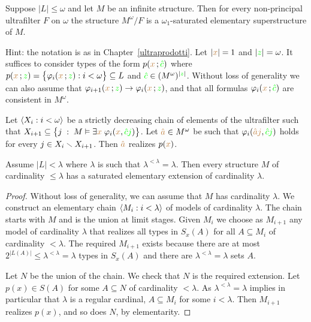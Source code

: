 \documentclass[creche.tex]{subfiles}
\begin{document}
\begin{exercise}
Suppose $|L|\le\omega$ and let $M$ be an infinite structure. Then for every non-principal ultrafilter $F$ on $\omega$ the structure $M^\omega/F$ is a $\omega_1$-saturated elementary superstructure of $M$.

Hint: the notation is as in Chapter~\ref{ultraprodotti}. Let $|{\color{brown} x}|=1$ and 
$|{\color{green} z}|=\omega$. It suffices to consider types of the form $p({\color{brown} x}\,;{\color{green}\hat c})$ where $p({\color{brown} x}\,;{\color{green} z})=\big\{\varphi_i({\color{brown} x}\,;{\color{green} z}):i<\omega\big\}\subseteq L$ and ${\color{green}\hat c}\in(M^\omega)^{|{\color{green} z}|}$. Without loss of generality we can also assume that $\varphi_{i+1}({\color{brown} x}\,;{\color{green} z})\rightarrow\varphi_i({\color{brown} x}\,;{\color{green} z})$, and that all formulas $\varphi_i({\color{brown} x}\,;{\color{green}\hat c})$ are consistent in $M^\omega$. 

Let $\langle X_i:i<\omega\rangle$ be a strictly decreasing chain of elements of the ultrafilter such that  $X_{i+1}\subseteq\big\{j\;:\;M\vDash\exists{\color{brown}x}\;\varphi_i({\color{brown} x},{\color{green}\hat cj})\big\}$. Let ${\color{brown}\hat a}\in M^\omega$ be such that  $\varphi_i({\color{brown}\hat aj},{\color{green}\hat cj})$ holds for every $j\in X_i\smallsetminus X_{i+1}$. Then ${\color{brown}\hat a}$ realizes $p({\color{brown} x})$.\QED
\end{exercise}


\begin{theorem}\label{thm_esistenza_staturo_card_inacc}
Assume $|L|<\lambda$ where $\lambda$ is such that $\lambda^{<\lambda}=\lambda$. Then every structure $M$ of cardinality $\le\lambda$ has a saturated elementary extension of cardinality $\lambda$.
\end{theorem}

\begin{proof}
Without loss of generality, we can assume that $M$ has cardinality $\lambda$. We construct an elementary chain $\langle M_i : i<\lambda\rangle$ of models of cardinality $\lambda$. The chain starts with $M$ and is the union at limit stages. Given $M_i$ we choose as $M_{i+1}$ any model of cardinality $\lambda$ that realizes all types in $S_x(A)$ for all $A\subseteq M_i$ of cardinality $<\lambda$. The required $M_{i+1}$ exists because there are at most $2^{|L(A)|}\le\lambda^{<\lambda}=\lambda$ types in $S_x(A)$ and there are $\lambda^{<\lambda}=\lambda$ sets $A$.

Let $N$ be the union of the chain. We check that $N$ is the required extension. Let $p(x)\in S(A)$ for some $A\subseteq N$ of cardinality $<\lambda$. As $\lambda^{<\lambda}=\lambda$ implies in particular that $\lambda$ is a regular cardinal,  $A\subseteq M_i$ for some $i<\lambda$. Then $M_{i+1}$ realizes $p(x)$, and so does $N$, by elementarity.
\end{proof}
\end{document}
